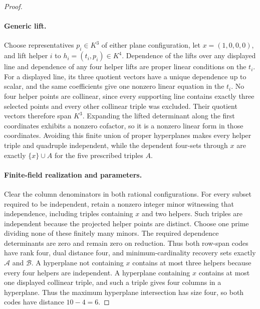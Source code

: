 \begin{proof}
\paragraph{Generic lift.}
Choose representatives $p_i\in K^3$ of either plane configuration, let
$x=(1,0,0,0)$, and lift helper $i$ to $h_i=(t_i,p_i)\in K^4$.  Dependence of
the lifts over any displayed line and dependence of any four helper lifts are
proper linear conditions on the $t_i$.  For a displayed line, its three
quotient vectors have a unique dependence up to scalar, and the same
coefficients give one nonzero linear equation in the $t_i$.  No four helper
points are collinear, since every supporting line contains exactly
three selected points and every other collinear triple was excluded.  Their
quotient vectors therefore span $K^3$.  Expanding the lifted determinant along
the first coordinates exhibits a nonzero cofactor, so it is a nonzero linear
form in those coordinates.  Avoiding this finite union of proper hyperplanes
makes every helper triple and quadruple independent, while the dependent
four-sets through $x$ are exactly $\{x\}\cup A$ for the five prescribed
triples $A$.

\paragraph{Finite-field realization and parameters.}
Clear the column denominators in both rational configurations.  For every
subset required to be independent, retain a nonzero integer minor witnessing
that independence, including triples containing $x$ and two helpers.  Such
triples are independent because the projected helper points are distinct.
Choose one prime dividing none of these finitely many minors.  The required
dependence determinants are zero and remain zero on reduction.  Thus both
row-span codes have rank four, dual distance four, and minimum-cardinality
recovery sets exactly $\mathcal A$ and $\mathcal B$.  A
hyperplane not containing $x$ contains at most three helpers because every
four helpers are independent.  A hyperplane containing $x$ contains at most
one displayed collinear triple, and such a triple gives four columns in a
hyperplane.  Thus the maximum hyperplane intersection has size four, so both
codes have distance $10-4=6$.
%
\end{proof}

